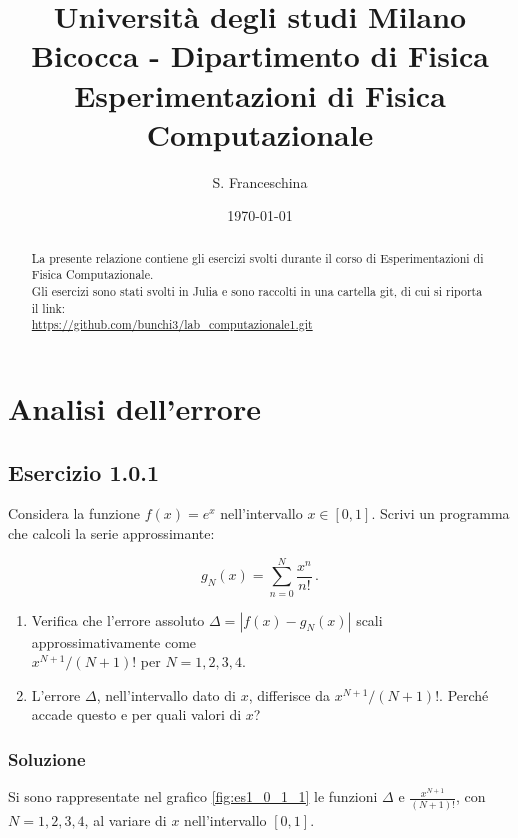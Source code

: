 \documentclass[letterpaper, 12pt]{article}
\numberwithin{equation}{section}    %
\begin{document}
\title{{\small Università degli studi Milano Bicocca - Dipartimento di Fisica}\\
	Esperimentazioni di Fisica Computazionale}
\author{S. Franceschina}
\date{\today}
\maketitle
\thispagestyle{logoheader}

\begin{abstract} 
La presente relazione contiene gli esercizi svolti durante il corso di 
Esperimentazioni di Fisica Computazionale. \\
Gli esercizi sono stati svolti in Julia e sono raccolti in una cartella git, di cui si riporta il link: \\
\url{https://github.com/bunchi3/lab_computazionale1.git} \\

\end{abstract}
\tableofcontents
\newpage

\section{Analisi dell'errore}
\subsection{Esercizio 1.0.1}
Considera la funzione $f(x)=e^x$ nell'intervallo $x\in [0,1]$. Scrivi un programma che calcoli
la serie approssimante:

\begin{equation}
    g_N(x)=\sum_{n=0}^N \frac{x^n}{n!}\,.
\end{equation}

\begin{enumerate}
    \item Verifica che l'errore assoluto $\Delta=|f(x)-g_N(x)|$ scali approssimativamente come \\ 
    $x^{N+1}/(N+1)!$ per $N=1,2,3,4$.
    \item L'errore $\Delta$, nell'intervallo dato di $x$, differisce da $x^{N+1}/(N+1)!$. 
    Perché accade questo e per quali valori di $x$?
\end{enumerate}

\subsubsection{Soluzione}
Si sono rappresentate nel grafico \ref{fig:es1_0_1_1} le funzioni $\Delta$ e $\frac{x^{N+1}}{(N+1)!}$, con 
$N=1,2,3, 4$, al variare di $x$ nell'intervallo $[0,1]$. 
\end{document}
